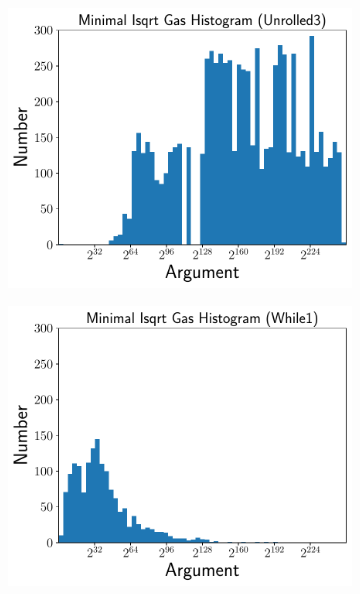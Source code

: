 \begin{figure}[p]
\centering
    \begin{subfigure}[t]{0.45\textwidth}
    \includegraphics[width=\textwidth]{plots/minimal_hist_Unrolled3_er.pdf}
    \end{subfigure}
    \begin{subfigure}[t]{0.45\textwidth}
    \includegraphics[width=\textwidth]{plots/minimal_hist_While1_er.pdf}
    \end{subfigure}


\end{figure}
